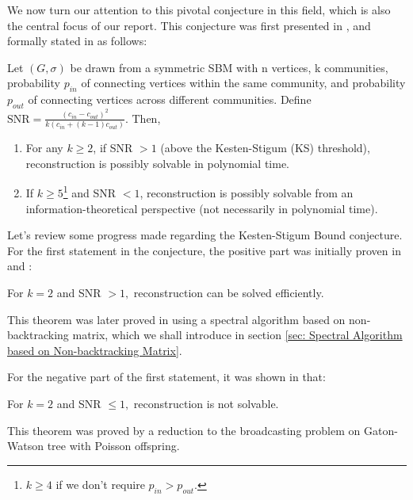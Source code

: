 We now turn our attention to this pivotal conjecture in this field, which is also the central focus of our report. This conjecture was first presented in \cite{firstpaper}, and formally stated in \cite{TheConjecture} as follows:
\begin{conjecture}\label{Conj}
    Let $(G, \sigma)$ be drawn from a symmetric SBM with n vertices, k communities, probability $p_{in}$ of connecting vertices within the same community, and probability $p_{out}$ of connecting vertices across different communities. Define $\text{SNR} = \frac{(c_{in}-c_{out})^2}{k(c_{in}+(k-1)c_{out})}.$ Then,
\begin{enumerate}
    \item For any \(k \geq 2\), if SNR \(> 1\) (above the Kesten-Stigum (KS) threshold), reconstruction is possibly solvable in polynomial time.
    \item If \(k \geq 5\)\footnote{$k\geq4$ if we don't require $p_{in}>p_{out}.$} and SNR $<1$,  reconstruction is possibly solvable from an information-theoretical perspective (not necessarily in polynomial time).
\end{enumerate}
\end{conjecture}
Let's review some progress made regarding the Kesten-Stigum Bound conjecture. For the first statement in the conjecture, the positive part was initially proven in \cite{mas14} and \cite{mns14b}:
\begin{theorem}\label{thm:1.1.1}
    For $k=2$ and SNR $>1,$ reconstruction can be solved efficiently.
\end{theorem}
\begin{remark}
    This theorem was later proved in \cite{blm15} using a spectral algorithm based on non-backtracking matrix, which we shall introduce in section \ref{sec: Spectral Algorithm based on Non-backtracking Matrix}.
\end{remark}
For the negative part of the first statement, it was shown in \cite{mns15} that:
\begin{theorem}\label{thm:1.1.2}
    For $k=2$ and SNR $\leq1,$ reconstruction is not solvable.
\end{theorem}
\begin{remark}
    This theorem was proved by a reduction to the broadcasting problem on Gaton-Watson tree with Poisson offspring.
\end{remark}

